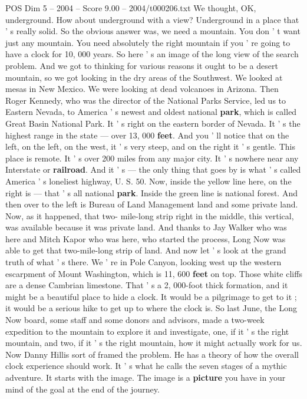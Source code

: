 \begin{textsample}{POS Dim 5 – 2004 – Score 9.00 – 2004/t000206.txt}
We thought, OK, underground.
How about underground with a view?
Underground in a place that ' s really solid.
So the obvious answer was, we need a mountain.
You don ' t want just any mountain.
You need absolutely the right mountain if you ' re going to have a clock for 10, 000 years.
So here ' s an image of the long view of the search problem.
And we got to thinking for various reasons it ought to be a desert mountain, so we got looking in the dry areas of the Southwest.
We looked at mesas in New Mexico.
We were looking at dead volcanoes in Arizona.
Then Roger Kennedy, who was the director of the National Parks Service, led us to Eastern Nevada, to America ' s newest and oldest national \textbf{park}, which is called Great Basin National Park.
It ' s right on the eastern border of Nevada.
It ' s the highest range in the state — over 13, 000 \textbf{feet}.
And you ' ll notice that on the left, on the left, on the west, it ' s very steep, and on the right it ' s gentle.
This place is remote.
It ' s over 200 miles from any major city.
It ' s nowhere near any Interstate or \textbf{railroad}.
And it ' s — the only thing that goes by is what ' s called America ' s loneliest highway, U.
S. 50.
Now, inside the yellow line here, on the right is — that ' s all national \textbf{park}.
Inside the green line is national forest.
And then over to the left is Bureau of Land Management land and some private land.
Now, as it happened, that two- mile-long strip right in the middle, this vertical, was available because it was private land.
And thanks to Jay Walker who was here and Mitch Kapor who was here, who started the process, Long Now was able to get that two-mile-long strip of land.
And now let ' s look at the grand truth of what ' s there.
We ' re in Pole Canyon, looking west up the western escarpment of Mount Washington, which is 11, 600 \textbf{feet} on top.
Those white cliffs are a dense Cambrian limestone.
That ' s a 2, 000-foot thick formation, and it might be a beautiful place to hide a clock.
It would be a pilgrimage to get to it ; it would be a serious hike to get up to where the clock is.
So last June, the Long Now board, some staff and some donors and advisors, made a two-week expedition to the mountain to explore it and investigate, one, if it ' s the right mountain, and two, if it ' s the right mountain, how it might actually work for us.
Now Danny Hillis sort of framed the problem.
He has a theory of how the overall clock experience should work.
It ' s what he calls the seven stages of a mythic adventure.
It starts with the image.
The image is a \textbf{picture} you have in your mind of the goal at the end of the journey.

\end{textsample}
